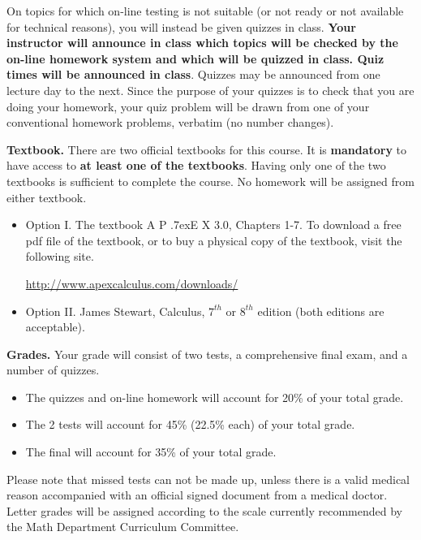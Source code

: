\documentclass{article}
\newcommand{\apex}{A\kern -1pt \lower -2pt\hbox{P}\kern -4pt \lower .7ex\hbox{E}\kern -1pt X}
\begin{document}
On topics for which on-line testing is not suitable (or not ready or not available for technical reasons), you will instead be given quizzes in class. \textbf{Your instructor will announce in class which topics will be checked by the on-line homework system and which will be quizzed in class. Quiz times will be announced in class}. Quizzes may be announced from one lecture day to the next. Since the purpose of your quizzes is to check that you are doing your homework, your quiz problem will be drawn from one of your conventional homework problems, verbatim (no number changes). 



\medskip\noindent \textbf{Textbook. } There are two official textbooks for this course. It is  \textbf{mandatory} to have access to \textbf{at least one of the textbooks}. Having only one of the two textbooks is sufficient to complete the course. No homework will be assigned from either textbook. 

\begin{itemize}
\item Option I. The textbook \apex{} 3.0, Chapters 1-7. To download a free pdf file of the textbook, or to buy a physical copy of the textbook, visit the following site.

\url{http://www.apexcalculus.com/downloads/} 
\item Option II. James Stewart, Calculus, $7^{th}$ or $8^{th}$ edition (both editions are acceptable).
\end{itemize}



\medskip
\noindent \textbf{Grades.} Your grade will consist of two tests, a comprehensive final exam, and a number of quizzes. 
\begin{itemize}
\item The quizzes and on-line homework will account for 20\% of your total grade.
\item The 2 tests will account for 45\% (22.5\% each) of your total grade.
\item The final will account for 35\% of your total grade.
\end{itemize}
Please note that missed tests can not be made up, unless there is a valid medical reason accompanied with an official signed document from a medical doctor. Letter grades will be assigned according to the scale currently recommended by the Math Department Curriculum Committee. 
\end{document}
